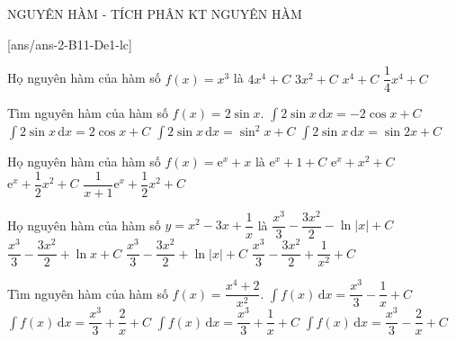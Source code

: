 \begin{name}
	{NGUYÊN HÀM - TÍCH PHÂN}
	{KT NGUYÊN HÀM}
	{\tentruong}
	{\thoigian}
\end{name}
\setcounter{ex}{0}\setcounter{bt}{0}
[ans/ans-2-B11-De1-lc]
\TN
\begin{ex}%
	Họ nguyên hàm của hàm số $f(x)=x^3$ là
	\choice
	{$4x^4+C$}
	{$3x^2+C$}
	{$x^4+C$}
	{\True $\dfrac{1}{4}x^4+C$}
\end{ex}

\begin{ex}%
	Tìm nguyên hàm của hàm số $ f(x)=2\sin x$.
	\choice
	{\True $\displaystyle\int 2\sin x\mathrm{\,d}x=-2\cos x+C$}
	{$\displaystyle\int 2\sin x\mathrm{\,d}x=2\cos x+C$}
	{$\displaystyle\int 2\sin x\mathrm{\,d}x=\sin^2x+C$}
	{$\displaystyle\int 2\sin x\mathrm{\,d}x=\sin 2x+C$}
\end{ex}

\begin{ex}%
	Họ nguyên hàm của hàm số $f(x)=\mathrm{e}^x+x$ là
	\choice
	{$\mathrm{e}^x+1+C$}
	{$\mathrm{e}^x+x^2+C$}
	{\True $\mathrm{e}^x+\dfrac{1}{2}{x^2}+C$}
	{$\dfrac{1}{x+1}{\mathrm{e}^x}+\dfrac{1}{2}{x^2}+C$}
\end{ex}

\begin{ex}%
	Họ nguyên hàm của hàm số $y=x^2-3x+\dfrac{1}{x}$ là
	\choice
	{$\dfrac{x^3}{3}-\dfrac{3x^2}{2}-\ln \left|x\right|+C$}
	{$\dfrac{x^3}{3}-\dfrac{3x^2}{2}+\ln x+C$}
	{\True $\dfrac{x^3}{3}-\dfrac{3x^2}{2}+\ln \left|x\right|+C$}
	{$\dfrac{x^3}{3}-\dfrac{3x^2}{2}+\dfrac{1}{x^2}+C$}
\end{ex}

\begin{ex}%
	Tìm nguyên hàm của hàm số $f(x)=\dfrac{x^4+2}{x^2}$.
	\choice
	{$\displaystyle\int f(x)\mathrm{\,d}x=\dfrac{x^3}{3}-\dfrac{1}{x}+C$}
	{$\displaystyle\int f(x)\mathrm{\,d}x=\dfrac{x^3}{3}+\dfrac{2}{x}+C$}
	{$\displaystyle\int f(x)\mathrm{\,d}x=\dfrac{x^3}{3}+\dfrac{1}{x}+C$}
	{\True $\displaystyle\int f(x)\mathrm{\,d}x=\dfrac{x^3}{3}-\dfrac{2}{x}+C$}
\end{ex}

